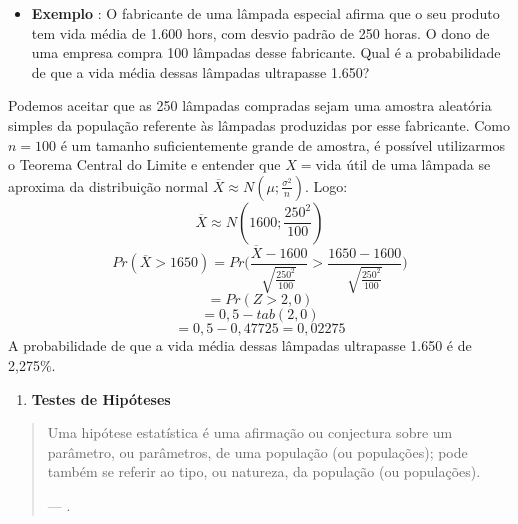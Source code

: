 \documentclass[
  openany]{book}
\providecommand{\tightlist}{%
  \setlength{\itemsep}{0pt}\setlength{\parskip}{0pt}}
\begin{document}
\begin{itemize}
\tightlist
\item
  \textbf{Exemplo} \citep{fariaestatistic}: O fabricante de uma lâmpada especial afirma que o seu produto tem vida média de 1.600 hors, com desvio padrão de 250 horas. O dono de uma empresa compra 100 lâmpadas desse fabricante. Qual é a probabilidade de que a vida média dessas lâmpadas ultrapasse 1.650?
\end{itemize}

Podemos aceitar que as 250 lâmpadas compradas sejam uma amostra aleatória simples da população referente às lâmpadas produzidas por esse fabricante. Como \(n=100\) é um tamanho suficientemente grande de amostra, é possível utilizarmos o Teorema Central do Limite e entender que \(X=\)vida útil de uma lâmpada se aproxima da distribuição normal \(\overline{X}\approx N(\mu;\frac{\sigma^2}{n})\). Logo:
\[\overline{X}\approx N(1600;\frac{250^2}{100})\]
\[Pr(\overline{X}>1650)=Pr\bigg( \frac{\overline{X}-1600}{\sqrt{\frac{250^2}{100}}}>\frac{1650-1600}{\sqrt{\frac{250^2}{100}}} \bigg)\]
\[=Pr(Z>2,0)\]
\[=0,5-tab(2,0)\]
\[=0,5-0,47725=0,02275\]
A probabilidade de que a vida média dessas lâmpadas ultrapasse 1.650 é de 2,275\%.

\begin{enumerate}
\def\labelenumi{\arabic{enumi}.}
\setcounter{enumi}{11}
\tightlist
\item
  \textbf{Testes de Hipóteses}
\end{enumerate}

\begin{quote}
Uma hipótese estatística é uma afirmação ou conjectura sobre um parâmetro, ou parâmetros, de uma população (ou populações); pode também se referir ao tipo, ou natureza, da população (ou populações).

--- \citet{freund2009estatistica}.
\end{quote}
\end{document}
